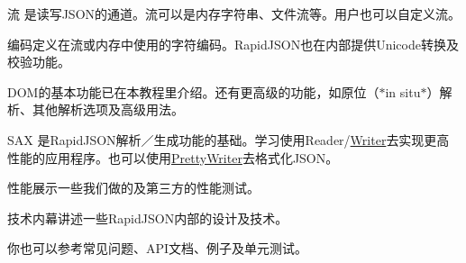 \begin{DoxyEnumerate}
\item 流 是读写\+J\+S\+O\+N的通道。流可以是内存字符串、文件流等。用户也可以自定义流。
\item 编码定义在流或内存中使用的字符编码。\+Rapid\+J\+S\+O\+N也在内部提供\+Unicode转换及校验功能。
\item D\+OM的基本功能已在本教程里介绍。还有更高级的功能，如原位（$\ast$in situ$\ast$）解析、其他解析选项及高级用法。
\item S\+AX 是\+Rapid\+J\+S\+O\+N解析／生成功能的基础。学习使用{\ttfamily Reader}/{\ttfamily \hyperlink{class_writer}{Writer}}去实现更高性能的应用程序。也可以使用{\ttfamily \hyperlink{class_pretty_writer}{Pretty\+Writer}}去格式化\+J\+S\+O\+N。
\item 性能展示一些我们做的及第三方的性能测试。
\item 技术内幕讲述一些\+Rapid\+J\+S\+O\+N内部的设计及技术。
\end{DoxyEnumerate}

你也可以参考常见问题、\+A\+P\+I文档、例子及单元测试。 